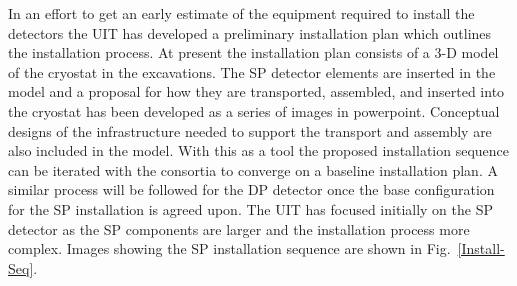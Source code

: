 In an effort to get an early estimate of the equipment required to install the detectors the UIT has developed a preliminary installation plan which outlines the installation process. At present the installation plan consists of a 3-D model of the cryostat in the excavations. The SP detector elements are inserted in the model and a proposal for how they are transported, assembled, and inserted into the cryostat has been developed as a series of images in powerpoint. Conceptual designs of the infrastructure needed to support the transport and assembly are also included in the model. With this as a tool the proposed installation sequence can be iterated with the consortia to converge on a baseline installation plan. A similar process will be followed for the DP detector once the base configuration for the SP installation is agreed upon. The UIT has focused initially on the SP detector as the SP components are larger and the installation process more complex. Images showing the SP installation sequence are shown in Fig.~\ref{Install-Seq}. 
